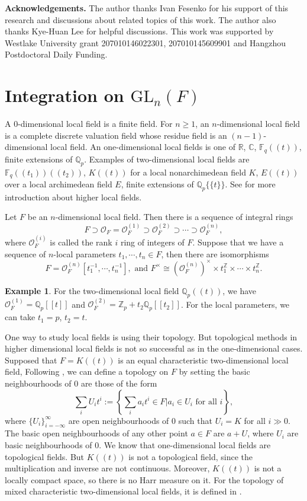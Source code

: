 \documentclass{amsart}
\theoremstyle{definition}
\newtheorem{example}[theorem]{Example}
\theoremstyle{remark}
\numberwithin{equation}{section}
\def  \GL        {\mathrm{GL}}
\def  \co       {\mathcal{O}}
\def  \bc       {\mathbb{C}}
\def  \bF       {\mathbb{F}}
\def  \bq       {\mathbb{Q}}
\def  \br       {\mathbb{R}}
\def  \bz       {\mathbb{Z}}
\begin{document}
 \vspace{5pt}
\textbf{Acknowledgements.} The author thanks Ivan Fesenko for his support of this research and discussions about related topics of this work.  The author also thanks  Kye-Huan Lee for helpful discussions.
	This work was supported by Westlake University grant 207010146022301, 207010145609901 and Hangzhou Postdoctoral Daily Funding.
	

\section{Integration on $\GL_n(F)$}

  A $0$-dimensional local field is a finite field. For $n\geq 1$, an $n$-dimensional local field is a complete  discrete valuation field whose residue field is an $(n-1)$-dimensional local field.
 An one-dimensional local fields is one of $\br$, $\bc$, $\bF_{q}((t))$,  finite extensions of $\bq_p$.     Examples of two-dimensional local fields are $\bF_q((t_1))((t_2))$,  $K((t))$ for a local nonarchimedean field $K$,  $E((t))$ over a local archimedean field $E$,  finite extensions of $\bq_p \{\{t\}\}$. See \cite{fesenko2000invitation} for more introduction about higher local fields.

Let $F$ be an $n$-dimensional local field. Then there  is a sequence of integral rings
$$
F \supset  \co_F =\co_F^{(1)} \supset  \co_F^{(2)} \supset \cdots \supset \co_F^{(n)},
$$
where $\co_{F}^{(i)}$ is called the rank $i$ ring of integers of $F$.  Suppose that we have
a sequence of $n$-local  parameters $t_1, \cdots, t_n \in F$, then there are isomorphisms
$$
F= \co^{(n)}_F[t_1^{-1}, \cdots, t^{-1}_n], \text{ and } F^{\times} \cong (\co_F^{(n)})^{\times} \times t_1^{\bz} \times \cdots \times t_n^{\bz}.
$$


\begin{example}
  For the two-dimensional local field $\bq_p((t))$,  we have $\co^{(1)}_F =\bq_p[[t]] $ and $\co_F^{(2)}= \bz_p+t_2 \bq_p[[t_2]]$. For the local parameters, we can take $t_1=p$, $t_2=t$.
\end{example}


 One way to study local  fields  is using their topology. But  topological methods in higher dimensional local fields is not  so successful as in the one-dimensional cases.    Supposed that $F= K((t))$ is  an equal characteristic  two-dimensional local  field,   
Following \cite{parshin1984local},  we can define a topology  on $F$ by setting the basic neighbourhoods of $0$ are those of the form
	$$
	\sum_{i}U_i t^i := \left\{ \sum_{i}^{}a_i t^i \in F| a_i \in U_i  \text{ for all } i   \right\},
	$$
	where $\{U_i\}_{i= -\infty}^{\infty}$ are open neighbourhoods of $0$ such that $U_i=K$  for all $i  \gg  0$. The basic open neighbourhoods of any other point $a \in F$ are $a+U$, where $U_i$ are basic neighbourhoods of $0$.
  We know that one-dimensional local fields are topological fields. But $K((t))$ is not a topological field, since the multiplication and inverse are not continuous. Moreover,  $K((t))$  is not a locally compact space,  so there is no Harr measure on it.  For the topology of mixed characteristic  two-dimensional local fields,  it is defined in \cite{fesenko2001sequential}.  
\end{document}
